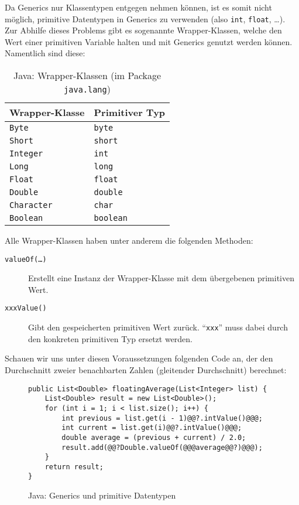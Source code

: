 		Da Generics nur Klassentypen entgegen nehmen können, ist es somit nicht möglich, primitive Datentypen in Generics zu verwenden (also \texttt{int}, \texttt{float}, \dots). Zur Abhilfe dieses Problems gibt es sogenannte Wrapper-Klassen, welche den Wert einer primitiven Variable halten und mit Generics genutzt werden können. Namentlich sind diese:
		\begin{table}[H]
			\centering
			\begin{tabular}{l | l}
				Wrapper-Klasse     & Primitiver Typ   \\ \hline
				\texttt{Byte}      & \texttt{byte}    \\
				\texttt{Short}     & \texttt{short}   \\
				\texttt{Integer}   & \texttt{int}     \\
				\texttt{Long}      & \texttt{long}    \\
				\texttt{Float}     & \texttt{float}   \\
				\texttt{Double}    & \texttt{double}  \\
				\texttt{Character} & \texttt{char}    \\
				\texttt{Boolean}   & \texttt{boolean}
			\end{tabular}
			\caption{Java: Wrapper-Klassen (im Package \texttt{java.lang})}
		\end{table}
		Alle Wrapper-Klassen haben unter anderem die folgenden Methoden:
		\begin{description}
			\item[\texttt{valueOf(\dots)}] Erstellt eine Instanz der Wrapper-Klasse mit dem übergebenen primitiven Wert.
			\item[\texttt{xxxValue()}]     Gibt den gespeicherten primitiven Wert zurück. \enquote{\texttt{xxx}} muss dabei durch den konkreten primitiven Typ ersetzt werden.
		\end{description}
		
		Schauen wir uns unter diesen Voraussetzungen folgenden Code an, der den Durchschnitt zweier benachbarten Zahlen (gleitender Durchschnitt) berechnet:
		\begin{figure}[H]
			\centering
			\begin{lstlisting}
public List<Double> floatingAverage(List<Integer> list) {
	List<Double> result = new List<Double>();
	for (int i = 1; i < list.size(); i++) {
		int previous = list.get(i - 1)@@?.intValue()@@@;
		int current = list.get(i)@@?.intValue()@@@;
		double average = (previous + current) / 2.0;
		result.add(@@?Double.valueOf(@@@average@@?)@@@);
	}
	return result;
}
			\end{lstlisting}
			\caption{Java: Generics und primitive Datentypen}
			\label{fig:java_generics_motivation_gen}
		\end{figure}
		

